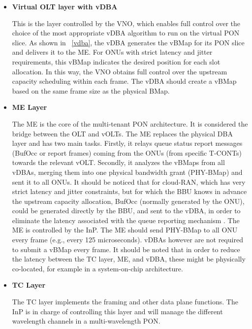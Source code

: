 \begin{itemize}
\item \par{\textbf{Virtual \ac{OLT} layer with \ac{vDBA}}}


This is the layer controlled by the \ac{VNO}, which enables full control over the choice of the most appropriate \ac{vDBA} algorithm to run on the virtual \ac{PON} slice. As shown in \figureautorefname~\ref{vdba}, the \ac{vDBA} generates the \ac{vBMap} for its \ac{PON} slice and delivers it to the \ac{ME}. For \acp{ONU} with strict latency and jitter requirements, this \ac{vBMap} indicates the desired position for each slot allocation. In this way, the \ac{VNO} obtains full control over the upstream capacity scheduling within each frame. The \ac{vDBA} should create a \ac{vBMap} based on the same frame size as the physical \ac{BMap}.
   
    \item \par{\textbf{\acf{ME} Layer}}
    
The \ac{ME} is the core of the multi-tenant \ac{PON} architecture. It is considered the bridge between the \ac{OLT} and \acp{vOLT}. The \ac{ME} replaces the physical \ac{DBA} layer and has two main tasks. Firstly, it relays queue status report messages (BufOcc or report frames) coming from the \acp{ONU} (from specific \acp{T-CONT}) towards the relevant \ac{vOLT}. Secondly, it analyzes the \acp{vBMap} from all \acp{vDBA}, merging them into one physical bandwidth grant (PHY-\ac{BMap}) and sent it to all \acp{ONU}. It should be noticed that for cloud-RAN, which has very strict latency and jitter constraints, but for which the \ac{BBU} knows in advance the upstream capacity allocation, BufOcc (normally generated by the \ac{ONU}), could be generated directly by the \ac{BBU}, and sent to the \ac{vDBA}, in order to eliminate the latency associated with the queue reporting mechanism \cite{ituG.front, 6886953}. 
The \ac{ME} is controlled by the \ac{InP}. The \ac{ME} should send PHY-\ac{BMap} to all \ac{ONU} every frame (e.g., every 125 microseconds). \acp{vDBA} however are not required to submit a \ac{vBMap} every frame. It should be noted that in order to reduce the latency between the \ac{TC} layer, \ac{ME}, and \ac{vDBA}, these might be physically co-located, for example in a system-on-chip architecture.

\item \par{\textbf{\acf{TC} Layer}} 

The \ac{TC} layer implements the framing and other data plane functions. The \ac{InP} is in charge of controlling this layer and will manage the different wavelength channels in a multi-wavelength \ac{PON}. 
\end{itemize}





